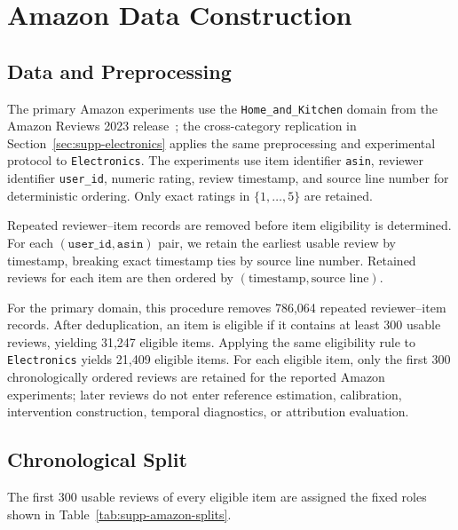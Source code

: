 \section{Amazon Data Construction}
\label{sec:supp-amazon-data}

\subsection{Data and Preprocessing}
\label{sec:supp-amazon-preprocessing}

The primary Amazon experiments use the \texttt{Home\_and\_Kitchen}
domain from the Amazon Reviews 2023 release~\cite{amazonreviews2023}; the
cross-category replication in Section~\ref{sec:supp-electronics} applies
the same preprocessing and experimental protocol to \texttt{Electronics}.
The experiments use item identifier \texttt{asin}, reviewer identifier
\texttt{user\_id}, numeric rating, review timestamp, and source line number
for deterministic ordering. Only exact ratings in $\{1,\ldots,5\}$ are
retained.

Repeated reviewer--item records are removed before item eligibility is
determined. For each $(\texttt{user\_id},\texttt{asin})$ pair, we retain the
earliest usable review by timestamp, breaking exact timestamp ties by source
line number. Retained reviews for each item are then ordered by
$(\text{timestamp},\text{source line})$.

For the primary domain, this procedure removes 786,064 repeated
reviewer--item records. After deduplication, an item is eligible if it
contains at least 300 usable reviews, yielding 31,247 eligible items. Applying the same eligibility rule to \texttt{Electronics} yields
21,409 eligible items.
For each eligible item, only the first 300
chronologically ordered reviews are retained for the reported Amazon
experiments; later reviews do not enter reference estimation, calibration,
intervention construction, temporal diagnostics, or attribution evaluation.



\subsection{Chronological Split}
\label{sec:supp-amazon-splits}

The first 300 usable reviews of every eligible item are assigned the fixed
roles shown in Table~\ref{tab:supp-amazon-splits}.

